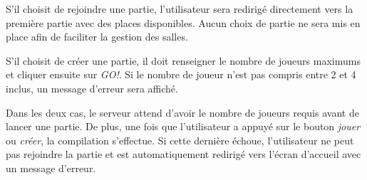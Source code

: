 		S'il choisit de rejoindre une partie, l'utilisateur sera redirigé directement vers la première partie avec des places disponibles. Aucun choix de partie ne sera mis en place afin de faciliter la gestion des salles.

		S'il choisit de créer une partie, il doit renseigner le nombre de joueurs maximums et cliquer ensuite sur \textit{GO!}. Si le nombre de joueur n'est pas compris entre 2 et 4 inclus, un message d'erreur sera affiché.

		Dans les deux cas, le serveur attend d'avoir le nombre de joueurs requis avant de lancer une partie. De plus, une fois que l'utilisateur a appuyé sur le bouton \textit{jouer} ou \textit{créer}, la compilation s'effectue. Si cette dernière échoue, l'utilisateur ne peut pas rejoindre la partie et est automatiquement redirigé vers l'écran d'accueil avec un message d'erreur.


